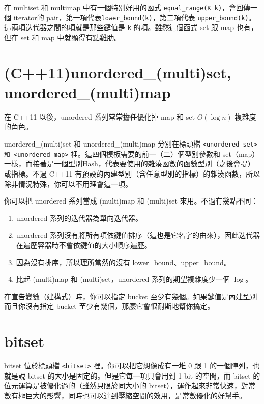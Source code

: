 \documentclass[a4paper, 11pt, oneside]{book}
\begin{document}
在 multiset 和 multimap 中有一個特別好用的函式 \texttt{equal\_range(K k)}，會回傳一個 iterator的 pair，第一項代表\texttt{lower\_bound(k)}，第二項代表 \texttt{upper\_bound(k)}。這兩項迭代器之間的項就是那些鍵值是 \texttt{k} 的項。雖然這個函式 set 跟 map 也有，但在 set 和 map 中就顯得有點雞肋。

\section{(C++11)unordered\_(multi)set, unordered\_(multi)map}
在 C++11 以後，unordered 系列常常擔任優化掉 map 和 set $O(\log n)$ 複雜度的角色。

unordered\_(multi)set 和 unordered\_(multi)map 分別在標頭檔 \texttt{<unordered\_set> 和 <unordered\_map>} 裡。這四個模板需要的前一（二）個型別參數和 set（map）一樣，而接著是一個型別Hash，代表要使用的雜湊函數的函數型別（之後會提）或指標。不過 C++11 有預設的內建型別（含任意型別的指標）的雜湊函數，所以除非情況特殊，你可以不用理會這一項。

你可以把 unordered 系列當成 (multi)map 和 (multi)set 來用。不過有幾點不同：
\begin{enumerate}
    \item unordered 系列的迭代器為單向迭代器。
    \item unordered 系列沒有將所有項依鍵值排序（這也是它名字的由來），因此迭代器在遍歷容器時不會依鍵值的大小順序遍歷。
    \item 因為沒有排序，所以理所當然的沒有 lower\_bound、upper\_bound。
    \item 比起 (multi)map 和 (multi)set，unordered 系列的期望複雜度少一個 $\log$。
\end{enumerate}

在宣告變數（建構式）時，你可以指定 bucket 至少有幾個。如果鍵值是內建型別而且你沒有指定 bucket 至少有幾個，那麼它會很耐斯地幫你搞定。

\section{bitset}

bitset 位於標頭檔 \texttt{<bitset>} 裡。你可以把它想像成有一堆 0 跟 1 的一個陣列，也就是說 bitset 的大小是固定的。但是它每一項只會用到 1 bit 的空間，而 bitset 的位元運算是被優化過的（雖然只限於同大小的 bitset），運作起來非常快速，對常數有極巨大的影響，同時也可以達到壓縮空間的效用，是常數優化的好幫手。
\end{document}
